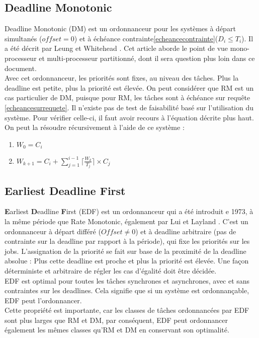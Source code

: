 \documentclass[11pt,a4paper,oneside]{report}
\begin{document}
\subsection{Deadline Monotonic}
Deadline Monotonic (DM) est un ordonnanceur pour les systèmes à départ simultanés ($offset = 0$) et 
à échéance contrainte\ref{echeancecontrainte}($D_i \leq T_i$). Il a été décrit par Leung et Whitehead 
\cite{LeungW82}. Cet article aborde le point de vue mono-processeur et multi-processeur partitionné, 
dont il sera question plus loin dans ce document.\\

Avec cet ordonnanceur, les priorités sont fixes, au niveau des tâches.
Plus la deadline est petite, plus la priorité est élevée. On peut considérer que RM est 
un cas particulier de DM, puisque pour RM, les tâches sont à échéance sur requête \ref{echeancesurrequete}.
Il n'existe pas de test de faisabilité basé sur l'utilisation du système. Pour vérifier celle-ci, 
il faut avoir recours à l'équation décrite plus haut. 
On peut la résoudre récursivement à l'aide de ce système : \\
\begin{enumerate}
	\item $W_0 = C_i $
	\item $W_{k+1} = C_i + \sum_{j = 1}^{i-1}\lceil \frac{W_k}{T_j} \rceil \times C_j $
\end{enumerate}



\subsection{Earliest Deadline First}
\cite{ndoye}
\textbf{E}arliest \textbf{D}eadline \textbf{F}irst (EDF) est un ordonnanceur 
qui a été introduit e 1973, à la même période que Rate Monotonic, également 
par Lui et Layland \cite{liulayland}. C'est un ordonnanceur à départ différé ($Offset \neq 0$) 
et à deadline arbitraire (pas de contrainte sur la deadline par rapport à la période), 
qui fixe les priorités sur les jobs. L'assignation de la priorité se fait sur base de 
la proximité de la deadline absolue : Plus cette deadline est proche et plus la priorité est élevée. 
Une façon déterministe et arbitraire de régler les cas d'égalité doit être décidée.\\

EDF est optimal pour toutes les tâches synchrones et asynchrones, avec et sans 
contraintes sur les deadlines. 
Cela signifie que si un système est ordonnançable, EDF peut l'ordonnancer.\\
Cette propriété est importante, car les classes de tâches ordonnancées par EDF 
sont plus larges que RM et DM, par conséquent, EDF peut ordonnancer également les 
mêmes classes qu'RM et DM en conservant son optimalité. \\
\end{document}
